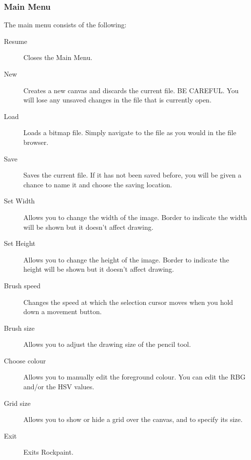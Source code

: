 \subsubsection{Main Menu}
The main menu consists of the following:
\begin{description}
    \item[Resume]
        Closes the Main Menu.
    \item[New]
        Creates a new canvas and discards the current file. BE CAREFUL.
        You will lose any unsaved changes in the file that is currently open.
    \item[Load]
        Loads a bitmap file. Simply navigate to the file as you
        would in the file browser.
    \item[Save]
        Saves the current file. If it has not been saved before,
        you will be given a chance to name it and choose the saving location.
    \item[Set Width]
        Allows you to change the width of the image.
        Border to indicate the width will be shown but it doesn't affect drawing.
    \item[Set Height]
        Allows you to change the height of the image.
        Border to indicate the height will be shown but it doesn't affect drawing.
    \item[Brush speed]
        Changes the speed at which the selection cursor
        moves when you hold down a movement button.
    \item[Brush size]
        Allows you to adjust the drawing size of the pencil tool.
    \item[Choose colour]
        Allows you to manually edit the foreground colour.
        You can edit the RBG and/or the HSV values.
    \item[Grid size]
        Allows you to show or hide a grid over the canvas,
        and to specify its size.
    \item[Exit]
        Exits Rockpaint.
\end{description}


